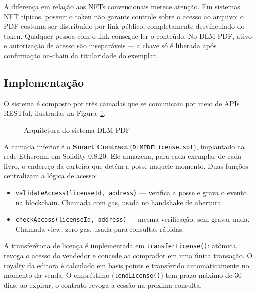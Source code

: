 \documentclass[12pt]{article}
\begin{document}
A diferença em relação aos NFTs convencionais merece atenção. Em sistemas NFT típicos, possuir o token não garante controle sobre o acesso ao arquivo: o PDF costuma ser distribuído por link público, completamente desvinculado do token. Qualquer pessoa com o link consegue ler o conteúdo. No DLM-PDF, ativo e autorização de acesso são inseparáveis — a chave só é liberada após confirmação on-chain da titularidade do exemplar.

\subsection{Implementação}

O sistema é composto por três camadas que se comunicam por meio de APIs RESTful, ilustradas na Figura~\ref{fig:arquitetura}.

\begin{figure}[H]
\centering
\caption{Arquitetura do sistema DLM-PDF}
\label{fig:arquitetura}
\end{figure}

A camada inferior é o \textbf{Smart Contract} (\texttt{DLMPDFLicense.sol}), implantado na rede Ethereum em Solidity 0.8.20. Ele armazena, para cada exemplar de cada livro, o endereço da carteira que detém a posse naquele momento. Duas funções centralizam a lógica de acesso:

\begin{itemize}
    \item \texttt{validateAccess(licenseId, address)} — verifica a posse e grava o evento na blockchain. Chamada com gas, usada no handshake de abertura.
    \item \texttt{checkAccess(licenseId, address)} — mesma verificação, sem gravar nada. Chamada view, zero gas, usada para consultas rápidas.
\end{itemize}

A transferência de licença é implementada em \texttt{transferLicense()}: atômica, revoga o acesso do vendedor e concede ao comprador em uma única transação. O royalty da editora é calculado em basis points e transferido automaticamente no momento da venda. O empréstimo (\texttt{lendLicense()}) tem prazo máximo de 30 dias; ao expirar, o contrato revoga a cessão na próxima consulta.
\end{document}
